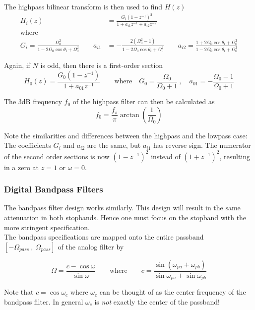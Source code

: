 The highpass bilinear transform is then used to find $H(z)$
\begin{align*}
	H_i(z) &= \frac{G_i (1-z^{-1})^2}{1 + a_{i1} z^{-1}+a_{i2}z^{-2}} \\
	\text{where} \\
	G_i = \frac{\Omega_0^2}{1-2\Omega_0\cos\theta_i + \Omega_0^2} \qquad
	a_{i1} &= -\frac{2(\Omega_0^2-1)}{1-2\Omega_0\cos\theta_i + \Omega_0^2} \qquad
	a_{i2} = \frac{1 + 2\Omega_0\cos\theta_i + \Omega_0^2}{1-2\Omega_0\cos\theta_i + \Omega_0^2}
\end{align*}

Again, if $N$ is odd, then there is a first-order section
\begin{equation*}
	H_0(z) = \frac{G_0(1-z^{-1})}{1 + a_{01} z^{-1}} \qquad \text{where} \quad
	G_0 = \frac{\Omega_0}{\Omega_0 + 1} \:,\quad
	a_{01} = -\frac{\Omega_0 - 1}{\Omega_0 + 1}
\end{equation*}

The 3dB frequency $f_0$ of the highpass filter can then be calculated as
\begin{equation*}
	f_0 = \frac{f_s}{\pi} \arctan\left(\frac{1}{\Omega_0}\right)
\end{equation*}

Note the similarities and differences between the highpass and the lowpass
case: The coefficients $G_i$ and $a_{i2}$ are the same, but $a_{i1}$ has
reverse sign. The numerator of the second order sections is now $(1-z^{-1})^2$
instead of $(1+z^{-1})^2$, resulting in a zero at $z=1$ or $\omega=0$.

\subsubsection{Digital Bandpass Filters}
The bandpass filter design works similarly. This design will result in the
same attenuation in both stopbands. Hence one must focus on the stopband
with the more stringent specification. \\

The bandpass specifications are mapped onto the entire passband
$[-\Omega_{pass}\:,\:\Omega_{pass}]$ of the analog filter by

\begin{equation*}
		\Omega = \frac{c - \cos\omega}{\sin\omega} \qquad \text{where} \qquad
		c = \frac{\sin\left(\omega_{pa}+\omega_{pb}\right)}
		{\sin\omega_{pa}+\sin\omega_{pb}}
\end{equation*}

Note that $c=\cos\omega_c$ where $\omega_c$ can be thought of as the center
frequency of the bandpass filter. In general $\omega_c$ is \emph{not} exactly
the center of the passband! \\

